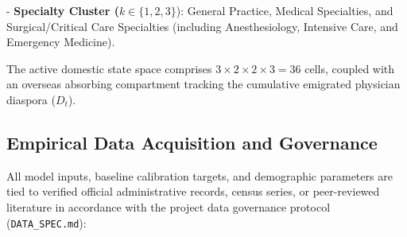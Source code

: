 \documentclass[
  11pt,
  a4paper]{article}
\begin{document}
- \textbf{Specialty Cluster (}\(k \in \{1, 2, 3\}\)): General Practice,
Medical Specialties, and Surgical/Critical Care Specialties (including
Anesthesiology, Intensive Care, and Emergency Medicine).

The active domestic state space comprises
\(3 \times 2 \times 2 \times 3 = 36\) cells, coupled with an overseas
absorbing compartment tracking the cumulative emigrated physician
diaspora (\(D_t\)).

\subsection{Empirical Data Acquisition and
Governance}\label{sec-methods-data}

All model inputs, baseline calibration targets, and demographic
parameters are tied to verified official administrative records, census
series, or peer-reviewed literature in accordance with the project data
governance protocol (\texttt{DATA\_SPEC.md}):
\end{document}
